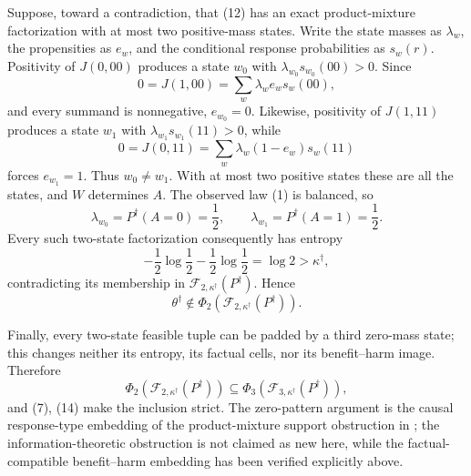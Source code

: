 Suppose, toward a contradiction, that (12) has an exact product-mixture
factorization with at most two positive-mass states.  Write the state masses
as \(\lambda_w\), the propensities as \(e_w\), and the conditional response
probabilities as \(s_w(r)\).  Positivity of \(J(0,00)\) produces a state
\(w_0\) with \(\lambda_{w_0}s_{w_0}(00)>0\).  Since
\[
 0=J(1,00)=\sum_w\lambda_w e_w s_w(00),
\]
and every summand is nonnegative, \(e_{w_0}=0\).  Likewise, positivity of
\(J(1,11)\) produces a state \(w_1\) with
\(\lambda_{w_1}s_{w_1}(11)>0\), while
\[
 0=J(0,11)=\sum_w\lambda_w(1-e_w)s_w(11)
\]
forces \(e_{w_1}=1\).  Thus \(w_0\neq w_1\).  With at most two positive
states these are all the states, and \(W\) determines \(A\).  The observed
law (1) is balanced, so
\[
 \lambda_{w_0}=P^\dagger(A=0)=\frac12,
 \qquad
 \lambda_{w_1}=P^\dagger(A=1)=\frac12.
\]
Every such two-state factorization consequently has entropy
\[
 -\frac12\log\frac12-\frac12\log\frac12=\log2
 >\kappa^\dagger,
 \tag{13}
\]
contradicting its membership in
\(\mathcal F_{2,\kappa^\dagger}(P^\dagger)\).  Hence
\[
 \theta^\dagger\notin
 \Phi_2(\mathcal F_{2,\kappa^\dagger}(P^\dagger)).
 \tag{14}
\]

Finally, every two-state feasible tuple can be padded by a third zero-mass
state; this changes neither its entropy, its factual cells, nor its
benefit--harm image.  Therefore
\[
 \Phi_2(\mathcal F_{2,\kappa^\dagger}(P^\dagger))
 \subseteq
 \Phi_3(\mathcal F_{3,\kappa^\dagger}(P^\dagger)),
\]
and (7), (14) make the inclusion strict.  The zero-pattern argument is the
causal response-type embedding of the product-mixture support obstruction in
\citet[Section V, Example 2 and Appendix A]{KumarLiElGamal2014}; the
information-theoretic obstruction is not claimed as new here, while the
factual-compatible benefit--harm embedding has been verified explicitly above.